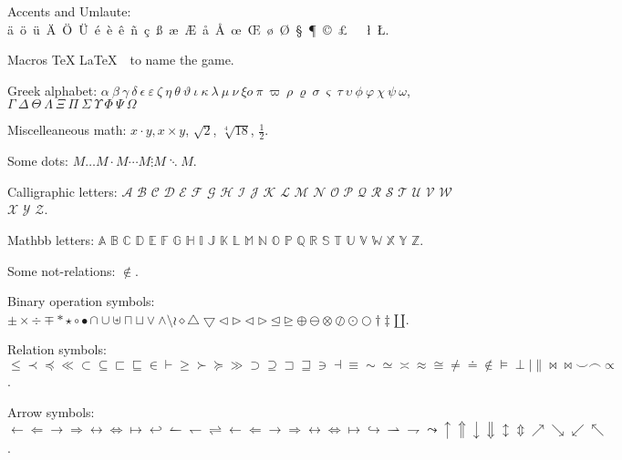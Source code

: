 
Accents and Umlaute: \"a\ \"o\ \"u\ \"A\ \"O\ \"{U}\ \'e\ \`e\ \^e\ 
  \~n\ \c{c}\ \ss{}\ \ae\ \AE\ \aa\ \AA\ \oe\ \OE\ \o\ \O\ \S\ 
  \P\ \copyright\ \pounds\ \dag\ \ddag\ \l\ \L.


Macros \TeX{} \LaTeX\ \LaTeXe\ to name the game.

Greek alphabet: $\alpha\ \beta\ \gamma\ \delta\ \epsilon\ 
    \varepsilon\ \zeta\ \eta\ \theta\ \vartheta\ \iota\ \kappa\ \lambda\
    \mu\ \nu\ \xi o\ \pi\ \varpi\ \rho\ \varrho\ \sigma\ \varsigma\ 
    \tau\ \upsilon\ \phi\ \varphi\ \chi\ \psi\ \omega$,  
    $\Gamma\ \Delta\ \Theta\ \Lambda\ \Xi\ \Pi\ \Sigma\ \Upsilon\ \Phi\ 
    \Psi\ \Omega$

Miscelleaneous math: $x \cdot y, x \times y$, $\sqrt{2}$, $\sqrt[4]{18}$,
    $\frac{1}{2}$.

Some dots: $M \ldots M \cdot M \cdots M \vdots M \ddots M$.

Calligraphic letters: $\mathcal{A}$ $\mathcal{B}$ $\mathcal{C}$ $\mathcal{D}$
 $\mathcal{E}$ $\mathcal{F}$ $\mathcal{G}$ $\mathcal{H}$ $\mathcal{I}$
 $\mathcal{J}$ $\mathcal{K}$ $\mathcal{L}$ $\mathcal{M}$ $\mathcal{N}$
 $\mathcal{O}$ $\mathcal{P}$ $\mathcal{Q}$ $\mathcal{R}$ $\mathcal{S}$
 $\mathcal{T}$ $\mathcal{U}$ $\mathcal{V}$ $\mathcal{W}$ $\mathcal{X}$
 $\mathcal{Y}$ $\mathcal{Z}$.

Mathbb letters: $\mathbb{A}$ $\mathbb{B}$ $\mathbb{C}$ $\mathbb{D}$
 $\mathbb{E}$ $\mathbb{F}$ $\mathbb{G}$ $\mathbb{H}$ $\mathbb{I}$
 $\mathbb{J}$ $\mathbb{K}$ $\mathbb{L}$ $\mathbb{M}$ $\mathbb{N}$
 $\mathbb{O}$ $\mathbb{P}$ $\mathbb{Q}$ $\mathbb{R}$ $\mathbb{S}$
 $\mathbb{T}$ $\mathbb{U}$ $\mathbb{V}$ $\mathbb{W}$ $\mathbb{X}$
 $\mathbb{Y}$ $\mathbb{Z}$.

Some not-relations: $ \not\in $.

Binary operation symbols: $ \pm \times \div \mp \ast \star \circ \bullet
 \cap \cup \uplus \sqcap \sqcup \vee \wedge \setminus \wr \diamond
 \bigtriangleup \bigtriangledown \triangleleft \triangleright \lhd
 \rhd \unlhd \unrhd \oplus \ominus \otimes \oslash \odot \bigcirc \dagger
 \ddagger \amalg$.

Relation symbols: $ \leq \prec \preceq \ll \subset \subseteq \sqsubset
 \sqsubseteq \in \vdash \geq \succ \succeq \gg \supset \supseteq \sqsupset
 \sqsupseteq \ni \dashv \equiv \sim \simeq \asymp \approx \cong \neq
 \doteq \notin \models \perp \mid \parallel \bowtie \Join \smile \frown
 \propto$.

Arrow symbols: $ \leftarrow \Leftarrow \rightarrow \Rightarrow \leftrightarrow
 \Leftrightarrow \mapsto \hookleftarrow \leftharpoonup \leftharpoondown
 \rightleftharpoons \longleftarrow \Longleftarrow \longrightarrow
 \Longrightarrow \longleftrightarrow \Longleftrightarrow \longmapsto
 \hookrightarrow \rightharpoonup \rightharpoondown \leadsto \uparrow \Uparrow
 \downarrow \Downarrow \updownarrow \Updownarrow \nearrow \searrow \swarrow
 \nwarrow$.

